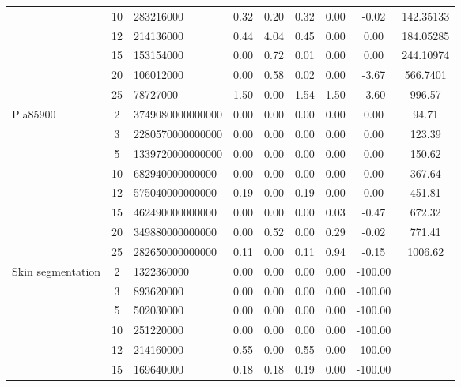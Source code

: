 {\begin{longtable}{@{}lclcccccc@{}}
                  & 10 & 283216000        & 0.32    & 0.20    & 0.32   & 0.00 & -0.02   & 142.35133 \\
                  & 12 & 214136000        & 0.44    & 4.04    & 0.45   & 0.00 & 0.00    & 184.05285 \\
                  & 15 & 153154000        & 0.00    & 0.72    & 0.01   & 0.00 & 0.00    & 244.10974 \\
                  & 20 & 106012000        & 0.00    & 0.58    & 0.02   & 0.00 & -3.67   & 566.7401  \\
                  & 25 & 78727000         & 1.50    & 0.00    & 1.54   & 1.50 & -3.60   & 996.57    \\ \hline
Pla85900          & 2  & 3749080000000000 & 0.00    & 0.00    & 0.00   & 0.00 & 0.00    & 94.71     \\
                  & 3  & 2280570000000000 & 0.00    & 0.00    & 0.00   & 0.00 & 0.00    & 123.39    \\
                  & 5  & 1339720000000000 & 0.00    & 0.00    & 0.00   & 0.00 & 0.00    & 150.62    \\
                  & 10 & 682940000000000  & 0.00    & 0.00    & 0.00   & 0.00 & 0.00    & 367.64    \\
                  & 12 & 575040000000000  & 0.19    & 0.00    & 0.19   & 0.00 & 0.00    & 451.81    \\
                  & 15 & 462490000000000  & 0.00    & 0.00    & 0.00   & 0.03 & -0.47   & 672.32    \\
                  & 20 & 349880000000000  & 0.00    & 0.52    & 0.00   & 0.29 & -0.02   & 771.41    \\
                  & 25 & 282650000000000  & 0.11    & 0.00    & 0.11   & 0.94 & -0.15   & 1006.62   \\ \hline
Skin segmentation & 2  & 1322360000       & 0.00    & 0.00    & 0.00   & 0.00 & -100.00 &           \\
                  & 3  & 893620000        & 0.00    & 0.00    & 0.00   & 0.00 & -100.00 &           \\
                  & 5  & 502030000        & 0.00    & 0.00    & 0.00   & 0.00 & -100.00 &           \\
                  & 10 & 251220000        & 0.00    & 0.00    & 0.00   & 0.00 & -100.00 &           \\
                  & 12 & 214160000        & 0.55    & 0.00    & 0.55   & 0.00 & -100.00 &           \\
                  & 15 & 169640000        & 0.18    & 0.18    & 0.19   & 0.00 & -100.00 &           \\

\end{longtable}}
